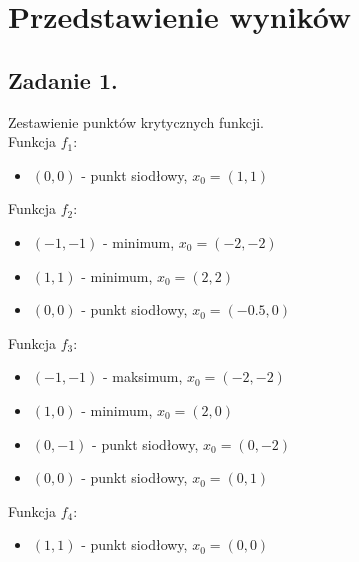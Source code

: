 \documentclass[11pt, leqno]{scrartcl}
\begin{document}
    \section{Przedstawienie wyników}
    \subsection{Zadanie 1.}
    Zestawienie punktów krytycznych funkcji. \\
    Funkcja $f_1$:
    \begin{itemize}
        \item $(0,0)$ - punkt siodłowy, $x_0=(1,1)$
    \end{itemize}
    Funkcja $f_2$:
    \begin{itemize}
        \item $(-1,-1)$ - minimum, $x_0=(-2,-2)$
        \item $(1,1)$ - minimum, $x_0=(2,2)$
        \item $(0,0)$ - punkt siodłowy, $x_0=(-0.5,0)$
    \end{itemize}
    Funkcja $f_3$:
    \begin{itemize}
        \item $(-1,-1)$ - maksimum, $x_0=(-2,-2)$
        \item $(1,0)$ - minimum, $x_0=(2,0)$
        \item $(0,-1)$ - punkt siodłowy, $x_0=(0,-2)$
        \item $(0,0)$ - punkt siodłowy, $x_0=(0,1)$
    \end{itemize}
    Funkcja $f_4$:
    \begin{itemize}
        \item $(1,1)$ - punkt siodłowy, $x_0=(0,0)$
    \end{itemize}
\end{document}
